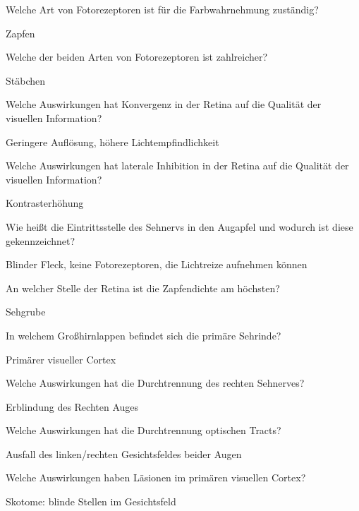 \documentclass[10pt, a4paper]{exam}
\newcommand\Warning{%
 \makebox[1.4em][c]{%
 \makebox[0pt][c]{\raisebox{.1em}{\small!}}%
 \makebox[0pt][c]{\color{red}\Large$\bigtriangleup$}}}%
\begin{document}
\begin{questions}
  \question Welche Art von Fotorezeptoren ist für die Farbwahrnehmung zuständig?
  \begin{solution}
    Zapfen
  \end{solution}

  \question Welche der beiden Arten von Fotorezeptoren ist zahlreicher?
  \begin{solution}
    Stäbchen
  \end{solution}

  \question Welche Auswirkungen hat Konvergenz in der Retina auf die Qualität der visuellen Information?
  \begin{solution}
    Geringere Auflösung, höhere Lichtempfindlichkeit
  \end{solution}

  \question Welche Auswirkungen hat laterale Inhibition in der Retina auf die Qualität der visuellen Information?
  \begin{solution}
    Kontrasterhöhung
  \end{solution}

  \question Wie heißt die Eintrittsstelle des Sehnervs in den Augapfel und wodurch ist diese gekennzeichnet?
  \begin{solution}
    Blinder Fleck, keine Fotorezeptoren, die Lichtreize aufnehmen können
  \end{solution}

  \question An welcher Stelle der Retina ist die Zapfendichte am höchsten?
  \begin{solution}
    Sehgrube
  \end{solution}

  \question In welchem Großhirnlappen befindet sich die primäre Sehrinde?
  \begin{solution}
    Primärer visueller Cortex \Warning
  \end{solution}

  \question Welche Auswirkungen hat die Durchtrennung des rechten Sehnerves?
  \begin{solution}
    Erblindung des Rechten Auges
  \end{solution}

  \question Welche Auswirkungen hat die Durchtrennung optischen Tracts?
  \begin{solution}
    Ausfall des linken/rechten Gesichtsfeldes beider Augen
  \end{solution}

  \question Welche Auswirkungen haben Läsionen im primären visuellen Cortex?
  \begin{solution}
    Skotome: blinde Stellen im Gesichtsfeld
  \end{solution}


\end{questions}
\end{document}
